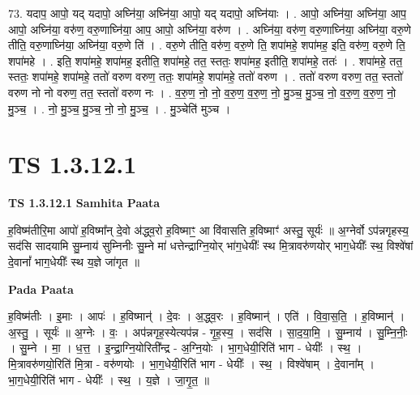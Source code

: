 \documentclass[17pt]{extarticle}
\begin{document}
73. यदाप॒ आपो॒ यद् यदापो॒ अघ्नि॑या॒ अघ्नि॑या॒ आपो॒ यद् यदापो॒ अघ्नि॑याः । . आपो॒ अघ्नि॑या॒ अघ्नि॑या॒ आप॒ आपो॒ अघ्नि॑या॒ वरु॑ण॒ वरु॒णाघ्नि॑या॒ आप॒ आपो॒ अघ्नि॑या॒ वरु॑ण । . अघ्नि॑या॒ वरु॑ण॒ वरु॒णाघ्नि॑या॒ अघ्नि॑या॒ वरु॒णे तीति॒ वरु॒णाघ्नि॑या॒ अघ्नि॑या॒ वरु॒णे ति॑ । . वरु॒णे तीति॒ वरु॑ण॒ वरु॒णे ति॒ शपा॑महे॒ शपा॑मह॒ इति॒ वरु॑ण॒ वरु॒णे ति॒ शपा॑महे । . इति॒ शपा॑महे॒ शपा॑मह॒ इतीति॒ शपा॑महे॒ तत॒ स्ततः॒ शपा॑मह॒ इतीति॒ शपा॑महे॒ ततः॑ । . शपा॑महे॒ तत॒ स्ततः॒ शपा॑महे॒ शपा॑महे॒ ततो॑ वरुण वरुण॒ ततः॒ शपा॑महे॒ शपा॑महे॒ ततो॑ वरुण । . ततो॑ वरुण वरुण॒ तत॒ स्ततो॑ वरुण नो नो वरुण॒ तत॒ स्ततो॑ वरुण नः । . व॒रु॒ण॒ नो॒ नो॒ व॒रु॒ण॒ व॒रु॒ण॒ नो॒ मु॒ञ्च॒ मु॒ञ्च॒ नो॒ व॒रु॒ण॒ व॒रु॒ण॒ नो॒ मु॒ञ्च॒ । . नो॒ मु॒ञ्च॒ मु॒ञ्च॒ नो॒ नो॒ मु॒ञ्च॒ । . मु॒ञ्चेति॑ मुञ्च । \newline
\pagebreak
{}

\section{ TS 1.3.12.1 }

\textbf{TS 1.3.12.1 } \newline
\textbf{Samhita Paata} \newline

ह॒विष्म॑तीरि॒मा आपो॑ ह॒विष्मा᳚न् दे॒वो अ॑द्ध्व॒रो ह॒विष्माꣳ॒॒ आ वि॑वासति ह॒विष्माꣳ॑ अस्तु॒ सूर्यः॑ ॥ अ॒ग्नेर्वो ऽप॑न्नगृहस्य॒ सद॑सि सादयामि सु॒म्नाय॑ सुम्निनीः सु॒म्ने मा॑ धत्तेन्द्राग्नि॒योर् भा॑ग॒धेयीः᳚ स्थ मि॒त्रावरु॑णयोर् भाग॒धेयीः᳚ स्थ॒ विश्वे॑षां दे॒वानां᳚ भाग॒धेयीः᳚ स्थ य॒ज्ञे जा॑गृत ॥ \newline

\textbf{Pada Paata} \newline

ह॒विष्म॑तीः । इ॒माः । आपः॑ । ह॒विष्मान्॑ । दे॒वः । अ॒द्ध्व॒रः । ह॒विष्मान्॑ । एति॑ । वि॒वा॒स॒ति॒ । ह॒विष्मान्॑ । अ॒स्तु॒ । सूर्यः॑ ॥ अ॒ग्नेः । वः॒ । अप॑न्नगृह॒स्येत्यप॑न्न - गृ॒ह॒स्य॒ । सद॑सि । सा॒द॒या॒मि॒ । सु॒म्नाय॑ । सु॒म्नि॒नीः॒ । सु॒म्ने । मा॒ । ध॒त्त॒ । इ॒न्द्रा॒ग्नि॒योरिती᳚न्द्र - अ॒ग्नि॒योः । भा॒ग॒धेयी॒रिति॑ भाग - धेयीः᳚ । स्थ॒ । मि॒त्रावरु॑णयो॒रिति॑ मि॒त्रा - वरु॑णयोः । भा॒ग॒धेयी॒रिति॑ भाग - धेयीः᳚ । स्थ॒ । विश्वे॑षाम् । दे॒वाना᳚म् । भा॒ग॒धेयी॒रिति॑ भाग - धेयीः᳚ । स्थ॒ । य॒ज्ञे । जा॒गृ॒त॒ ॥  \newline
\end{document}

